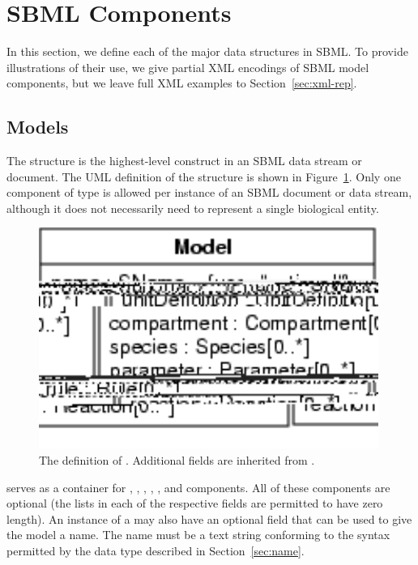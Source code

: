 \documentclass[10pt]{cekarticle}
\newcommand{\vref}[1]{\ref{#1}}
\begin{document}
\section{SBML Components}
\label{sec:elements}

In this section, we define each of the major data structures in SBML.  To
provide illustrations of their use, we give partial XML encodings of SBML
model components, but we leave full XML examples to
Section~\ref{sec:xml-rep}.


\subsection{Models}
\label{sec:model}

The  structure is the highest-level construct in an SBML data
stream or document.  The UML definition of the  structure is
shown in Figure~\vref{fig:model}.  Only one component of type 
is allowed per instance of an SBML document or data stream, although it
does not necessarily need to represent a single biological entity.

\begin{figure}[htb]
  \centering
  \includegraphics[scale = 0.68]{model}
  \caption{The definition of .  Additional fields are
    inherited from .}
  \label{fig:model}
\end{figure}

 serves as a container for ,
, , , , and
 components.  All of these components are optional (the
lists in each of the respective fields are permitted to have zero length).
An instance of a  may also have an optional 
field that can be used to give the model a name.  The name must be a text
string conforming to the syntax permitted by the  data type
described in Section~\ref{sec:name}.
\end{document}
